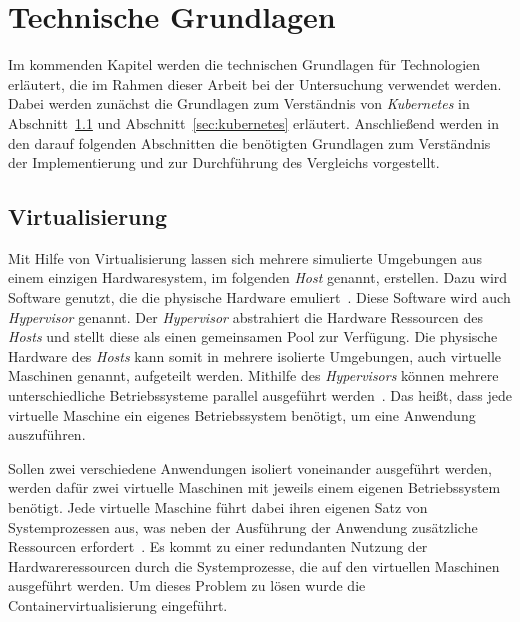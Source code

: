 \chapter{Technische Grundlagen}\label{ch:technical-basics}

Im kommenden Kapitel werden die technischen Grundlagen für Technologien erläutert, die im Rahmen dieser Arbeit
bei der Untersuchung verwendet werden. Dabei werden zunächst die Grundlagen zum Verständnis von \textit{Kubernetes}
in Abschnitt~\ref{sec:virtualization} und Abschnitt~\ref{sec:kubernetes} erläutert. Anschließend werden in den
darauf folgenden Abschnitten die benötigten Grundlagen zum Verständnis der Implementierung und zur Durchführung des Vergleichs
vorgestellt.

\section{Virtualisierung}\label{sec:virtualization}

Mit Hilfe von Virtualisierung lassen sich mehrere simulierte Umgebungen aus einem einzigen Hardwaresystem, im folgenden \textit{Host} genannt, erstellen.
Dazu wird Software genutzt, die die physische Hardware emuliert~\cite{virtualization-techtarget}. Diese Software wird auch \textit{Hypervisor} genannt.
Der \textit{Hypervisor} abstrahiert die Hardware Ressourcen des \textit{Hosts} und stellt diese als einen gemeinsamen Pool zur Verfügung.
Die physische Hardware des \textit{Hosts} kann somit in mehrere isolierte Umgebungen, auch virtuelle Maschinen genannt, aufgeteilt werden.
Mithilfe des \textit{Hypervisors} können mehrere unterschiedliche Betriebssysteme parallel ausgeführt werden~\cite{virtualization-red-hat, hypervisor-red-hat}.
Das heißt, dass jede virtuelle Maschine ein eigenes Betriebssystem benötigt, um eine Anwendung auszuführen.

Sollen zwei verschiedene Anwendungen isoliert voneinander ausgeführt werden, werden dafür zwei virtuelle Maschinen mit jeweils einem eigenen Betriebssystem benötigt.
Jede virtuelle Maschine führt dabei ihren eigenen Satz von Systemprozessen aus, was neben der Ausführung der Anwendung zusätzliche Ressourcen erfordert~\cite{kubernetes-in-action-introduction}.
Es kommt zu einer redundanten Nutzung der Hardwareressourcen durch die Systemprozesse, die auf den virtuellen Maschinen ausgeführt werden.
Um dieses Problem zu lösen wurde die Containervirtualisierung eingeführt.

